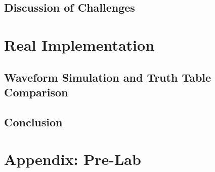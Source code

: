 \documentclass[16pt, letterpaper]{article}
\begin{document}
			\subsection{Discussion of Challenges}
			
			
			
		\section{Real Implementation}
		
			\subsection{Waveform Simulation and Truth Table Comparison}
			
			
			\subsection{Conclusion}
			
		\section{Appendix: Pre-Lab}
	
\end{document}
